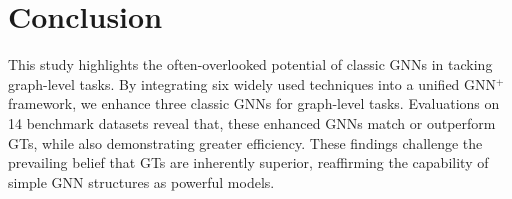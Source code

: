 \section{Conclusion}


This study highlights the often-overlooked potential of classic GNNs in tacking graph-level tasks. By integrating six widely used techniques into a unified GNN$^+$ framework, we enhance three classic GNNs for graph-level tasks. Evaluations on 14 benchmark datasets reveal that, these enhanced GNNs match or outperform GTs, while also demonstrating greater efficiency. These findings challenge the prevailing belief that GTs are inherently superior, reaffirming the capability of simple GNN structures as powerful models.